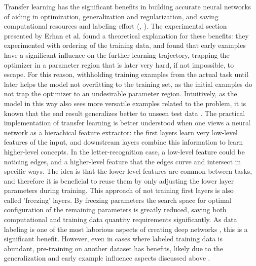 \documentclass{article}
\begin{document}
Transfer learning has the significant benefits in building accurate neural networks 
of aiding in optimization, generalization and regularization, and saving computational resources and labeling effort (\cite{erhanWhyDoesUnsupervised2010}, \cite{transferlearning_survey}).
The experimental section presented by Erhan et al. \cite{erhanWhyDoesUnsupervised2010} found a theoretical explanation for these benefits: they
experimented with ordering of the training data, and found 
that early examples have a significant influence on the further learning trajectory, trapping the optimizer in a parameter region that is later very hard, 
if not impossible, to escape. For this reason, withholding training examples from the actual task until later helps the model not overfitting to the training 
set, as the initial examples do not trap the optimizer to an undesirable parameter region. Intuitively, as the model in this way 
also sees more versatile examples related to the problem, it is known that the end result generalizes better to unseen test data \cite{transferlearning_survey}.
The practical implementation of transfer learning is better understood when one views a neural network as a hierachical feature extractor:
the first layers learn very low-level features of the input, and downstream layers combine this information to learn higher-level concepts.
In the letter-recognition case, a low-level feature could be noticing edges, and a higher-level feature that the edges curve and intersect in 
specific ways. The idea is that the lower level features are common between tasks, and therefore it is beneficial to reuse them by only 
adjusting the lower layer parameters during training. This approach of not training first layers is also called 'freezing' layers.
By freezing parameters the search space for optimal configuration of the remaining parameters is greatly reduced, saving both computational 
and training data quantity requirements significantly. As data labeling is one of the most laborious aspects of creating deep networks \cite{engbook},
this is a significant benefit. However, even in cases where labeled training data is abundant, pre-training on another dataset has 
benefits, likely due to the generalization and early example influence aspects discussed above \cite{erhanWhyDoesUnsupervised2010}.
\end{document}
